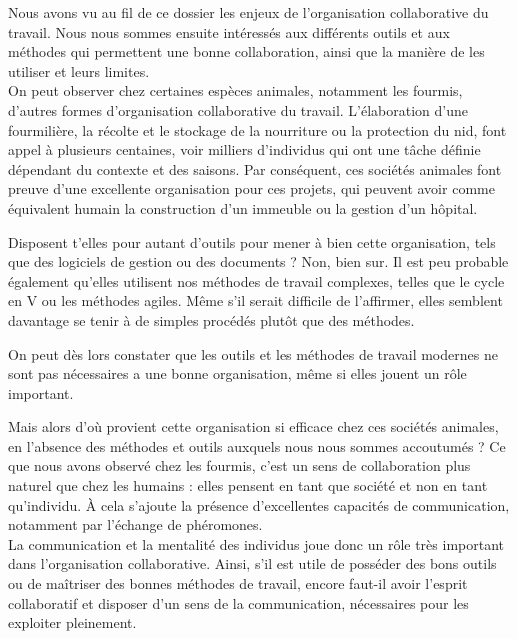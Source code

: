 
Nous avons vu au fil de ce dossier les enjeux de l'organisation collaborative du travail. Nous nous sommes ensuite intéressés aux différents outils et aux méthodes qui permettent une bonne collaboration, ainsi que la manière de les utiliser et leurs limites.\\

On peut observer chez certaines espèces animales, notamment les fourmis, d'autres formes d'organisation collaborative du travail. L'élaboration d'une fourmilière, la récolte et le stockage de la nourriture ou la protection du nid, font appel à plusieurs centaines, voir milliers d'individus qui ont une tâche définie dépendant du contexte et des saisons. Par conséquent, ces sociétés animales font preuve d'une excellente organisation pour ces projets, qui peuvent avoir comme équivalent humain la construction d'un immeuble ou la gestion d'un hôpital.

Disposent t'elles pour autant d'outils pour mener à bien cette organisation, tels que des logiciels de gestion ou des documents ? Non, bien sur. Il est peu probable également qu'elles utilisent nos méthodes de travail complexes, telles que le cycle en V ou les méthodes agiles. Même s'il serait difficile de l'affirmer, elles semblent davantage se tenir à de simples procédés plutôt que des méthodes.

On peut dès lors constater que les outils et les méthodes de travail modernes ne sont pas nécessaires a une bonne organisation, même si elles jouent un rôle important.

Mais alors d'où provient cette organisation si efficace chez ces sociétés animales, en l'absence des méthodes et outils auxquels nous nous sommes accoutumés ? Ce que nous avons observé chez les fourmis, c'est un sens de collaboration plus naturel que chez les humains : elles pensent en tant que société et non en tant qu'individu. À cela s'ajoute la présence d'excellentes capacités de communication, notamment par l'échange de phéromones.\\

La communication et la mentalité des individus joue donc un rôle très important dans l'organisation collaborative. Ainsi, s'il est utile de posséder des bons outils ou de maîtriser des bonnes méthodes de travail, encore faut-il avoir l'esprit collaboratif et disposer d'un sens de la communication, nécessaires pour les exploiter pleinement.\\

